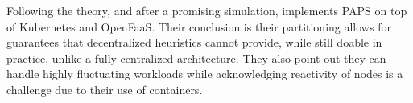 \documentclass[11pt]{sdm}
\begin{document}
\begin{description}
		Following the theory, and after a promising simulation, \citet{baresi_paps_2021} implements \gls{PAPS} on top of Kubernetes and OpenFaaS. Their conclusion is their partitioning allows for guarantees that decentralized heuristics cannot provide, while still doable in practice, unlike a fully centralized architecture. They also point out they can handle highly fluctuating workloads while acknowledging reactivity of nodes is a challenge due to their use of containers.



\end{description}
\end{document}
